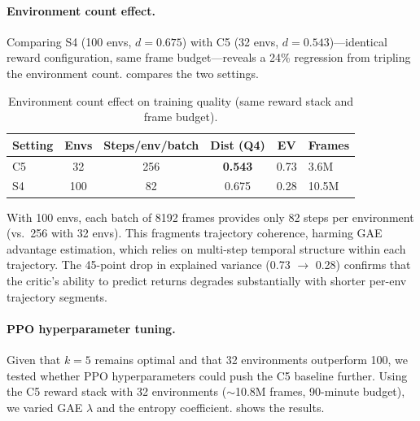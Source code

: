 \documentclass[11pt]{article}
\begin{document}
\paragraph{Environment count effect.}
Comparing S4 (100 envs, $d{=}0.675$) with C5 (32 envs, $d{=}0.543$)---identical reward configuration, same frame budget---reveals a 24\% regression from tripling the environment count.
 compares the two settings.

\begin{table}[H]
  \centering
  \small
  \renewcommand{\arraystretch}{1.3}
  \caption{Environment count effect on training quality (same reward stack and frame budget).}
  \label{tab:env-scaling}
  \begin{tabular}{@{}lccccl@{}}
    \toprule
    \textbf{Setting} & \textbf{Envs} & \textbf{Steps/env/batch} & \textbf{Dist (Q4)} & \textbf{EV} & \textbf{Frames} \\
    \midrule
    C5 & 32  & 256 & \textbf{0.543} & 0.73 & 3.6M \\
    S4 & 100 & 82  & 0.675          & 0.28 & 10.5M \\
    \bottomrule
  \end{tabular}
\end{table}

\noindent
With 100 envs, each batch of 8192 frames provides only 82 steps per environment (vs.\ 256 with 32 envs).
This fragments trajectory coherence, harming GAE advantage estimation, which relies on multi-step temporal structure within each trajectory.
The 45-point drop in explained variance (0.73 $\to$ 0.28) confirms that the critic's ability to predict returns degrades substantially with shorter per-env trajectory segments.

\paragraph{PPO hyperparameter tuning.}
Given that $k{=}5$ remains optimal and that 32 environments outperform 100, we tested whether PPO hyperparameters could push the C5 baseline further.
Using the C5 reward stack with 32 environments (${\sim}$10.8M frames, 90-minute budget), we varied GAE $\lambda$ and the entropy coefficient.
 shows the results.
\end{document}
